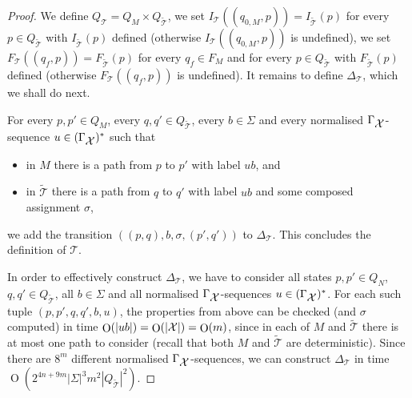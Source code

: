 \documentclass[
a4paper
]{article}
\theoremstyle{plain}
\theoremstyle{definition}
\theoremstyle{remark}
\newcommand{\varset}{\mbox{\ensuremath{\mathcal{X}}}}
\newcommand{\sst}{\mathcal{T}}
\DeclareMathOperator{\bigo}{O}
\begin{document}
\begin{proof}
We define $Q_{\sst} = Q_M \times Q_{\widetilde{\sst}}$, we set $I_{\sst}((q_{0, M}, p)) = I_{\widetilde{\sst}}(p)$ for every $p \in Q_{\widetilde{\sst}}$ with $I_{\widetilde{\sst}}(p)$ defined (otherwise $I_{\sst}((q_{0, M}, p))$ is undefined), we set $F_{\sst}((q_f, p)) = F_{\widetilde{\sst}}(p)$ for every $q_f \in F_M$ and for every $p \in Q_{\widetilde{\sst}}$ with $F_{\widetilde{\sst}}(p)$ defined (otherwise $F_{\sst}((q_f, p))$ is undefined). It remains to define $\Delta_{\sst}$, which we shall do next.


For every $p, p' \in Q_M$, every $q, q' \in Q_{\widetilde{\sst}}$, every $b \in \Sigma$ and every normalised $\Gamma_{\varset}$-sequence $u \in (\Gamma_{\varset})^*$ such that
\begin{itemize}
\item in $M$ there is a path from $p$ to $p'$ with label $u b$, and
\item in $\widetilde{\sst}$ there is a path from $q$ to $q'$ with label $u b$ and some composed assignment $\sigma$, 
\end{itemize}
we add the transition $((p, q), b, \sigma, (p', q'))$ to $\Delta_{\sst}$. This concludes the definition of $\sst$. 

In order to effectively construct $\Delta_{\sst}$, we have to consider all states $p, p' \in Q_N$, $q, q' \in Q_{\widetilde{\sst}}$, all $b \in \Sigma$ and all normalised $\Gamma_{\varset}$-sequences $u \in (\Gamma_{\varset})^*$. For each such tuple $(p, p', q, q', b, u)$, the properties from above can be checked (and $\sigma$ computed) in time $\bigo(|u b|) = \bigo(|\varset|) = \bigo(m)$, since in each of $M$ and $\widetilde{\sst}$ there is at most one path to consider (recall that both $M$ and $\widetilde{\sst}$ are deterministic). Since there are $8^m$ different normalised $\Gamma_{\varset}$-sequences, we can construct $\Delta_{\sst}$ in time $\bigo(2^{4n+9m} |\Sigma|^3 m^2 |Q_{\widetilde{\sst}}|^2)$.


\end{proof}
\end{document}
